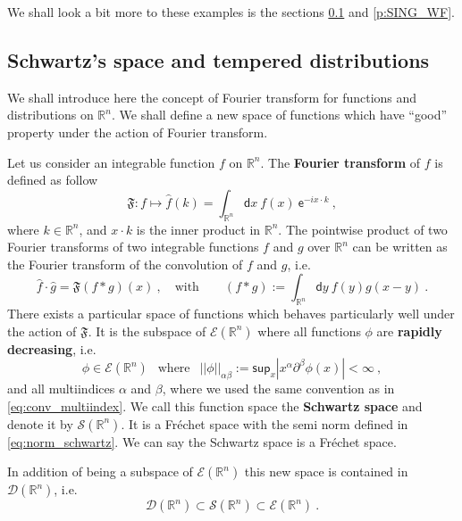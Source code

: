 \documentclass[11pt]{book}
\renewcommand{\sup}{\mathsf{sup}}
\newcommand{\abs}[1]{\left|#1\right|}
\newcommand{\norm}[1]{\left|\left|#1\right|\right|}
\newcommand{\Dcal}{\mathcal{D}}
\newcommand{\Ecal}{\mathcal{E}}
\newcommand{\Scal}{\mathcal{S}}
\newcommand{\Rbb}{\mathbb{R}}
\newcommand{\Frak}{\mathfrak{F}}
\newcommand{\dsf}{\mathsf{d}}
\newcommand{\esf}{\mathsf{e}}
\theoremstyle{break}
\begin{document}
We shall look a bit more to these examples is the sections \ref{p:FOURIER} and \ref{p:SING_WF}.


\subsection{Schwartz's space and tempered distributions}
\label{p:FOURIER}


We shall introduce here the concept of Fourier transform for functions and distributions on $\Rbb^n$. We shall define a new space of functions which have ``good'' property under the action of Fourier transform.


\bigskip


Let us consider an integrable function $f$ on $\Rbb^n$. The \textbf{Fourier transform} of $f$ is defined as follow
%
\begin{equation*}
\Frak : f \mapsto  \hat{f}(k) = \int_{\Rbb^n} \dsf x \ f(x) \ \esf^{-i x \cdot k} \ , 
\end{equation*}
%
where $k \in \Rbb^n$, and $x \cdot k$ is the inner product in $\Rbb^n$. The pointwise product of two Fourier transforms of two integrable functions $f$ and $g$ over $\Rbb^n$ can be written as the Fourier transform of the convolution of $f$ and $g$, i.e.
%
\begin{equation*}
\hat{f} \cdot \hat{g} = \Frak( f \ast g )(x) \ , \quad \mbox{with} \qquad (f \ast g) := \int_{\Rbb^n} \dsf y \ f(y) g(x-y) \ . 
\end{equation*}
%
There exists a particular space of functions which behaves particularly well under the action of $\Frak$. It is the subspace of $\Ecal(\Rbb^n)$ where all functions $\phi$ are \textbf{rapidly decreasing}, i.e.
%
\begin{equation}
\phi \in \Ecal(\Rbb^n) \ \ \mbox{ where } \ \ \norm{\phi}_{\alpha\beta} := \sup_x \abs{x^\alpha \partial^\beta \phi(x)} < \infty \ ,
\label{eq:norm_schwartz}
\end{equation}
%
and all multiindices $\alpha$ and $\beta$, where we used the same convention as in \eqref{eq:conv_multiindex}. We call this function space the \textbf{Schwartz space} and denote it by $\Scal(\Rbb^n)$. It is a Fréchet space with the semi norm defined in \eqref{eq:norm_schwartz}. We can say the Schwartz space is a Fréchet space. 


In addition of being a subspace of $\Ecal(\Rbb^n)$ this new space is contained in $\Dcal(\Rbb^n)$, i.e.
%
\begin{equation*}
\Dcal(\Rbb^n) \subset \Scal(\Rbb^n) \subset \Ecal(\Rbb^n) \ .
\end{equation*}
\end{document}
